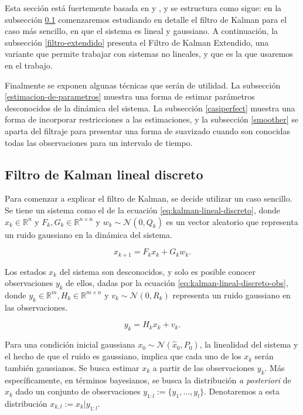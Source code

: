 Esta sección está fuertemente basada en \cite{Anderson2005} y \cite{Simon2006}, y se estructura como sigue: en la subsección \ref{filtro-lineal} comenzaremos estudiando en detalle el filtro de Kalman para el caso más sencillo, en que el sistema es lineal y gaussiano. A continuación, la subsección \ref{filtro-extendido} presenta el Filtro de Kalman Extendido, una variante que permite trabajar con sistemas no lineales, y que es la que usaremos en el trabajo.

Finalmente se exponen algunas técnicas que serán de utilidad. La subsección \ref{estimacion-de-parametros} muestra una forma de estimar parámetros desconocidos de la dinámica del sistema. La subsección \ref{casiperfect} muestra una forma de incorporar restricciones a las estimaciones, y la subsección \ref{smoother} se aparta del filtraje para presentar una forma de suavizado cuando son conocidas todas las observaciones para un intervalo de tiempo.

\subsection{Filtro de Kalman lineal discreto}\label{filtro-lineal}

Para comenzar a explicar el filtro de Kalman, se decide utilizar un caso sencillo. Se tiene un sistema como el de la ecuación \ref{eq:kalman-lineal-discreto}, donde \(x_k \in \mathbb{R}^{n}\) y \(F_k, G_k \in \mathbb{R}^{n \times n}\) y \(w_k \sim \mathcal{N}(0,Q_k)\) es un vector aleatorio que representa un ruido gaussiano en la dinámica del sistema. 

\begin{equation}\label{eq:kalman-lineal-discreto}
x_{k+1} = F_k x_k + G_k w_k.
\end{equation}

Los estados \(x_k\) del sistema son desconocidos, y solo es posible conocer observaciones \(y_k\) de ellos, dadas por la ecuación \ref{eq:kalman-lineal-discreto-obs}, donde \(y_k \in \mathbb{R}^{m}, H_k \in \mathbb{R}^{m \times n}\) y \( v_k \sim \mathcal{N}(0, R_k)\) representa un ruido gaussiano en las observaciones.

\begin{equation}\label{eq:kalman-lineal-discreto-obs}
y_k = H_k x_k  + v_k.
\end{equation}


Para una condición inicial gaussiana \(x_0 \sim \mathcal{N}(\hat{x}_0, P_0)\), la linealidad del sistema y el hecho de que el ruido es gaussiano, implica que cada uno de los \(x_k\) serán también gaussianos. Se busca estimar \(x_k\) a partir de las observaciones \(y_k\). Más específicamente, en términos bayesianos, se busca la distribución \textit{a posteriori} de \(x_k\) dado un conjunto de observaciones \(y_{1:l} := \{y_1, \dots, y_l\}\). Denotaremos a esta distribución \(x_{k,l}:= x_k | y_{1:l}\).

